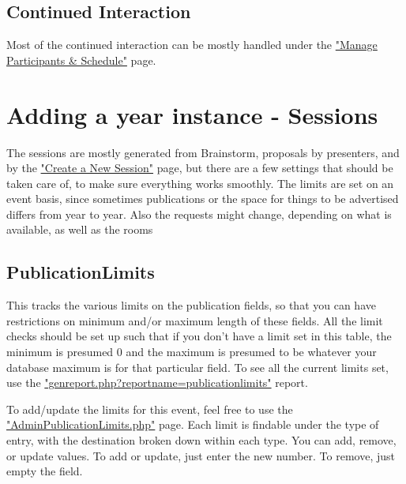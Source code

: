 \documentclass[captions=tablesignature]{scrartcl}
\begin{document}
\subsection{Continued Interaction}
\label{sec-12-4}

Most of the continued interaction can be mostly handled under the
\href{../webpages/StaffManageParticipants.php}{"Manage Participants \& Schedule"} page.

\section{Adding a year instance - Sessions}
\label{sec-13}

The sessions are mostly generated from Brainstorm, proposals by
presenters, and by the \href{../webpages/CreateSession.php}{"Create a New Session"} page, but there are a
few settings that should be taken care of, to make sure everything
works smoothly.  The limits are set on an event basis, since
sometimes publications or the space for things to be advertised
differs from year to year.  Also the requests might change,
depending on what is available, as well as the rooms
\subsection{PublicationLimits}
\label{sec-13-1}

This tracks the various limits on the publication fields, so that
you can have restrictions on minimum and/or maximum length of these
fields.  All the limit checks should be set up such that if you
don't have a limit set in this table, the minimum is presumed 0 and
the maximum is presumed to be whatever your database maximum is for
that particular field.  To see all the current limits set, use the
\href{../webpages/genreport.php?reportname=publicationlimits}{"genreport.php?reportname=publicationlimits"} report.

To add/update the limits for this event, feel free to use the
\href{../webpages/AdminPublicationLimits.php}{"AdminPublicationLimits.php"} page.  Each limit is findable under
the type of entry, with the destination broken down within each
type.  You can add, remove, or update values.  To add or update,
just enter the new number.  To remove, just empty the field.
\end{document}

